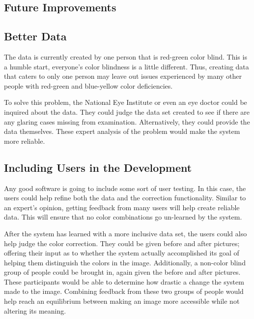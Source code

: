 \documentclass[12pt]{article}
\begin{document}
\begin{multicols}{2}
\section{Future Improvements}
\subsection{Better Data}
The data is currently created by one person that is red-green color blind. This is a humble start, everyone's color blindness is a little different. Thus, creating data that caters to only one person may leave out issues experienced by many other people with red-green and blue-yellow color deficiencies.

To solve this problem, the National Eye Institute or even an eye doctor could be inquired about the data. They could judge the data set created to see if there are any glaring cases missing from examination. Alternatively, they could provide the data themselves. These expert analysis of the problem would make the system more reliable.

\subsection{Including Users in the Development}
Any good software is going to include some sort of user testing. In this case, the users could help refine both the data and the correction functionality. Similar to an expert's opinion, getting feedback from many users will help create reliable data. This will ensure that no color combinations go un-learned by the system. 

After the system has learned with a more inclusive data set, the users could also help judge the color correction. They could be given before and after pictures; offering their input as to whether the system actually accomplished its goal of helping them distinguish the colors in the image. Additionally, a non-color blind group of people could be brought in, again given the before and after pictures. These participants would be able to determine how drastic a change the system made to the image. Combining feedback from these two groups of people would help reach an equilibrium between making an image more accessible while not altering its meaning.




\end{multicols}
\end{document}
